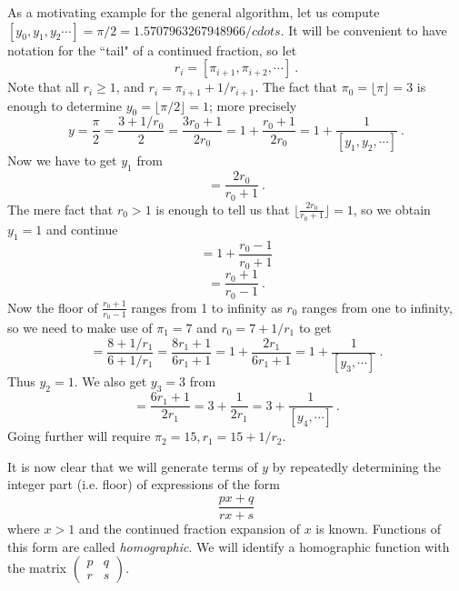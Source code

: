 \documentclass[11pt, oneside]{amsart}   	%
\begin{document}
As a motivating example for the general algorithm, let us compute $[y_0,y_1,y_2 \cdots] = \pi/2 = 1.5707963267948966/cdots$. It will be convenient to have notation for the ``tail" of a continued fraction, so let
\[
r_i = [\pi_{i+1}, \pi_{i+2},\cdots]\ .
\]
Note that all $r_i \geq 1$, and $r_i = \pi_{i+1} + 1/r_{i+1}$. The fact that $\pi_0 = \lfloor \pi \rfloor= 3$ is enough to determine $y_0=\lfloor \pi/2 \rfloor=1$; more precisely
\begin{equation}
y = \frac{\pi}{2} = \frac{3 + 1/r_0}{2} = \frac{3r_0+1}{2r_0} = 1 + \frac{r_0+1}{2r_0}= 1 + \frac{1}{[y_1,y_2,\cdots]}\ .
\end{equation}
Now we have to get $y_1$ from 
\begin{equation}
[y_1,y_2,\cdots] = \frac{2r_0}{r_0+1}\ .
\end{equation}
The mere fact that $r_0>1$ is enough to tell us that $\lfloor \frac{2r_0}{r_0+1} \rfloor = 1$, so we obtain $y_1=1$ and continue
\begin{equation}
[y_1,y_2,\cdots] = 1 + \frac{r_0-1}{r_0+1}
\end{equation}
\begin{equation}
[y_2,\cdots] = \frac{r_0+1}{r_0-1} \ .
\end{equation}
Now the floor of $\frac{r_0+1}{r_0-1}$ ranges from 1 to infinity as $r_0$ ranges from one to infinity, so we need to make use of $\pi_1 = 7$ and $r_0 = 7+1/r_1$ to get
\begin{equation}
[y_2,\cdots] = \frac{8 + 1/r_1}{6 + 1/r_1} = \frac{8r_1 + 1}{6r_1 + 1} = 1 + \frac{2r_1}{6r_1 + 1}= 1 + \frac{1}{[y_3,\cdots]}\ .
\end{equation}
Thus $y_2=1$.  We also get $y_3 = 3$ from
\begin{equation}
[y_3,\cdots] =  \frac{6r_1 + 1}{2r_1} = 3 + \frac{1}{2r_1} = 3 + \frac{1}{[y_4,\cdots]}\ .
\end{equation}
Going further will require $\pi_2=15, r_1 = 15+1/r_2$.

It is now clear that we will generate terms of $y$ by repeatedly determining the integer part (i.e. floor) of expressions of the form
\begin{equation}\label{eq:homographic}
\frac{px+q}{rx+s}
\end{equation}
where $x>1$ and the continued fraction expansion of $x$ is known. Functions of this form are called \emph{homographic}. %
We will identify a homographic function with the matrix
$\left(
\begin{smallmatrix} 
p & q\\ 
r & s 
\end{smallmatrix}
\right)$.
\end{document}
